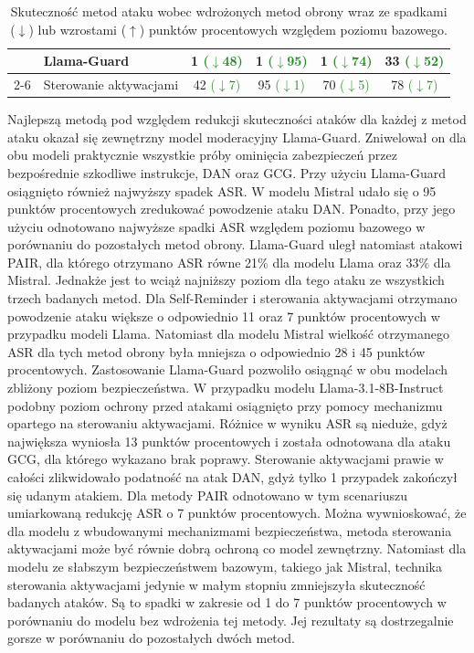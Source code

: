 \begin{table}[!ht]
\begin{tabular}{l|l|c|c|c|c}
                                        & Llama-Guard                             & 1 \textcolor{ForestGreen}{\scriptsize($\downarrow$48)}     & 1 \textcolor{ForestGreen}{\scriptsize($\downarrow$95)}  & 1 \textcolor{ForestGreen}{\scriptsize($\downarrow$74)}  & 33 \textcolor{ForestGreen}{\scriptsize($\downarrow$52)} \\\cline{2-6}
                                        & Sterowanie aktywacjami                  & 42 \textcolor{ForestGreen}{\scriptsize($\downarrow$7)}     & 95 \textcolor{ForestGreen}{\scriptsize($\downarrow$1)}  & 70 \textcolor{ForestGreen}{\scriptsize($\downarrow$5)}  & 78 \textcolor{ForestGreen}{\scriptsize($\downarrow$7)}  \\\hline
    \end{tabular}
    \caption{Skuteczność metod ataku wobec wdrożonych metod obrony wraz ze spadkami ($\downarrow$) lub wzrostami ($\uparrow$) punktów procentowych względem poziomu bazowego.}
    \label{tab:all_comparison_tab}
\end{table}
Najlepszą metodą pod względem redukcji skuteczności ataków dla każdej z metod ataku okazał się zewnętrzny model moderacyjny Llama-Guard. Zniwelował on dla obu modeli praktycznie wszystkie próby ominięcia zabezpieczeń przez bezpośrednie szkodliwe instrukcje, \gls{DAN} oraz \gls{GCG}. Przy użyciu Llama-Guard osiągnięto również najwyższy spadek \gls{ASR}. W modelu Mistral udało się o 95 punktów procentowych zredukować powodzenie ataku \gls{DAN}. Ponadto, przy jego użyciu odnotowano najwyższe spadki \gls{ASR} względem poziomu bazowego w porównaniu do pozostałych metod obrony.  Llama-Guard uległ natomiast atakowi \gls{PAIR}, dla którego otrzymano \gls{ASR} równe 21\% dla modelu Llama oraz 33\% dla Mistral. Jednakże jest to wciąż najniższy poziom dla tego ataku ze wszystkich trzech badanych metod. Dla Self-Reminder i sterowania aktywacjami otrzymano powodzenie ataku większe o odpowiednio 11 oraz 7 punktów procentowych w przypadku modeli Llama. Natomiast dla modelu Mistral wielkość otrzymanego \gls{ASR} dla tych metod obrony była mniejsza o odpowiednio 28 i 45 punktów procentowych. Zastosowanie Llama-Guard pozwoliło osiągnąć w obu modelach zbliżony poziom bezpieczeństwa.
W przypadku modelu Llama-3.1-8B-Instruct podobny poziom ochrony przed atakami osiągnięto przy pomocy mechanizmu opartego na sterowaniu aktywacjami. Różnice w wyniku \gls{ASR} są nieduże, gdyż największa wyniosła 13 punktów procentowych i została odnotowana dla ataku \gls{GCG}, dla którego wykazano brak poprawy. Sterowanie aktywacjami prawie w całości zlikwidowało podatność na atak \gls{DAN}, gdyż tylko 1 przypadek zakończył się udanym atakiem. Dla metody \gls{PAIR} odnotowano w tym scenariuszu umiarkowaną redukcję \gls{ASR} o 7 punktów procentowych. Można wywnioskować, że dla modelu z wbudowanymi mechanizmami bezpieczeństwa, metoda sterowania aktywacjami może być równie dobrą ochroną co model zewnętrzny. Natomiast dla modelu ze słabszym bezpieczeństwem bazowym, takiego jak Mistral, technika sterowania aktywacjami jedynie w małym stopniu zmniejszyła skuteczność badanych ataków. Są to spadki w zakresie od 1 do 7 punktów procentowych w porównaniu do modelu bez wdrożenia tej metody. Jej rezultaty są dostrzegalnie gorsze w porównaniu do pozostałych dwóch metod.
